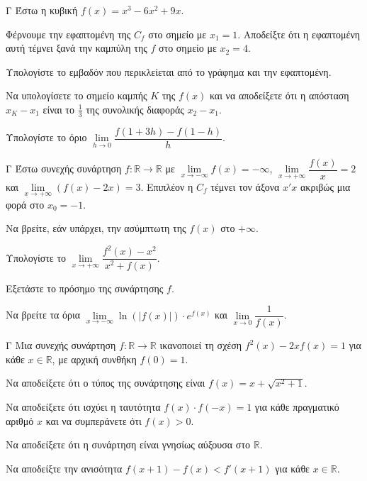 \begin{thema}{Γ}
Έστω η κυβική $f(x) = x^3 - 6x^2 + 9x$.
\begin{erwthma}
  \item Φέρνουμε την εφαπτομένη της $C_f$ στο σημείο με $x_1 = 1$. Αποδείξτε ότι η εφαπτομένη αυτή τέμνει ξανά την καμπύλη της $f$ στο σημείο με $x_2 = 4$.
  \item Υπολογίστε το εμβαδόν που περικλείεται από το γράφημα και την εφαπτομένη.
  \item Να υπολογίσετε το σημείο καμπής $K$ της $f(x)$ και να αποδείξετε ότι η απόσταση $x_K - x_1$ είναι το $\frac{1}{3}$ της συνολικής διαφοράς $x_2 - x_1$.
  \item Υπολογίστε το όριο $\lim\limits_{h \to 0} \dfrac{f(1+3h) - f(1-h)}{h}$.
\end{erwthma}
\end{thema}

\begin{thema}{Γ}
Έστω συνεχής συνάρτηση $f: \mathbb{R} \to \mathbb{R}$ με $\lim\limits_{x \to -\infty} f(x) = -\infty$, $\lim\limits_{x \to +\infty} \dfrac{f(x)}{x} = 2$ και $\lim\limits_{x \to +\infty} (f(x) - 2x) = 3$. Επιπλέον η $C_f$ τέμνει τον άξονα $x'x$ ακριβώς μια φορά στο $x_0 = -1$.
\begin{erwthma}
  \item Να βρείτε, εάν υπάρχει, την ασύμπτωτη της $f(x)$ στο $+\infty$. 
  \item Υπολογίστε το $\lim\limits_{x \to +\infty} \dfrac{f^2(x) - x^2}{x^2 + f(x)}$.
  \item Εξετάστε το πρόσημο της συνάρτησης $f$.
  \item Να βρείτε τα όρια $\lim\limits_{x \to -\infty} \ln(|f(x)|) \cdot e^{f(x)}$ και $\lim\limits_{x \to 0} \dfrac{1}{f(x)}$.
\end{erwthma}
\end{thema}

\begin{thema}{Γ}
Μια συνεχής συνάρτηση $f: \mathbb{R} \to \mathbb{R}$ ικανοποιεί τη σχέση $f^2(x) - 2x f(x) = 1$ για κάθε $x \in \mathbb{R}$, με αρχική συνθήκη $f(0) = 1$.
\begin{erwthma}
  \item Να αποδείξετε ότι ο τύπος της συνάρτησης είναι $f(x) = x + \sqrt{x^2+1}$.
  \item Να αποδείξετε ότι ισχύει η ταυτότητα $f(x) \cdot f(-x) = 1$ για κάθε πραγματικό αριθμό $x$ και να συμπεράνετε ότι $f(x) > 0$.
  \item Να αποδείξετε ότι η συνάρτηση είναι γνησίως αύξουσα στο $\mathbb{R}$.
  \item Να αποδείξτε την ανισότητα $f(x+1) - f(x) < f'(x+1)$ για κάθε $x \in \mathbb{R}$. 
\end{erwthma}
\end{thema}


